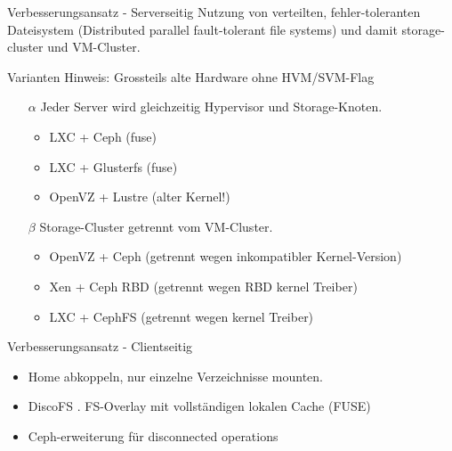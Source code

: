 \documentclass[hyperref={xetex}]{beamer}
\begin{document}
\begin{frame}{Verbesserungsansatz - Serverseitig}
		Nutzung von verteilten, fehler-toleranten Dateisystem (Distributed parallel fault-tolerant file systems) und damit storage-cluster und VM-Cluster.


	
    \begin{block}{Varianten}
        Hinweis: Grossteils alte Hardware ohne HVM/SVM-Flag
	\begin{itemize}
		\item [$\alpha$]Jeder Server wird gleichzeitig Hypervisor und Storage-Knoten. 
            \begin{itemize}
                \item  LXC + Ceph (fuse)
                \item  LXC + Glusterfs (fuse)
                \item  OpenVZ + Lustre (alter Kernel!)
            \end{itemize}
        \item [$\beta$] Storage-Cluster getrennt vom VM-Cluster.
            \begin{itemize}
                \item OpenVZ + Ceph (getrennt wegen inkompatibler Kernel-Version)
                \item Xen + Ceph RBD (getrennt wegen RBD kernel Treiber)
                \item LXC + CephFS  (getrennt wegen kernel Treiber)
            \end{itemize}
	\end{itemize}
        
    \end{block}

\end{frame}

\begin{frame}{Verbesserungsansatz - Clientseitig}
    \begin{itemize}
        \item Home abkoppeln, nur einzelne Verzeichnisse mounten. 
        \item DiscoFS . FS-Overlay mit vollständigen lokalen Cache (FUSE)
        \item Ceph-erweiterung für disconnected operations
    \end{itemize}
\end{frame}
\end{document}
